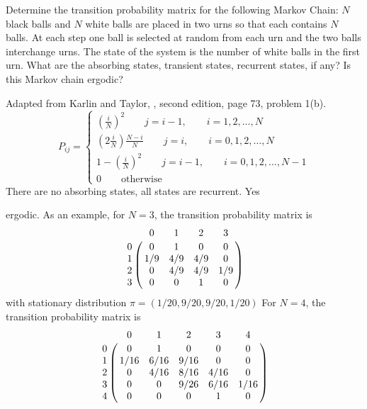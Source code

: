 \documentclass[12pt]{article}
\begin{document}
\begin{exercise}
    Determine the transition probability matrix for the following Markov
    Chain:  \( N \) black balls and \( N \) white balls are placed in
    two urns so that each contains \( N \) balls.  At each step one ball
    is selected at random from each urn and the two balls interchange
    urns.  The state of the system is the number of white balls in the
    first urn.  What are the absorbing states, transient states,
    recurrent states, if any?  Is this Markov chain ergodic?
\end{exercise}
\begin{solution}
    Adapted from Karlin and Taylor, , second edition, page 73, problem 1(b).
    \[
        P_{ij} =
        \begin{cases}
            (\frac{i}{N})^2 \qquad j = i-1, \qquad i=1,2,\dots,N \\
            (2\frac{i}{N})\frac{N-i}{N} \qquad j = i, \qquad i=0,1,2,\dots,N
            \\
            1- (\frac{i}{N})^2 \qquad j = i-1, \qquad i=0,1,2,\dots,N-1
            \\
            0 \qquad \text{otherwise}
        \end{cases}
    \] There are no absorbing states, all states are recurrent.  Yes

    ergodic.  As an example, for \( N = 3 \), the transition probability
    matrix is
    \[
        \bordermatrix{ & 0 & 1 & 2 & 3 \cr
        0 & 0 & 1 & 0 & 0 \cr
        1 & 1/9 & 4/9 & 4/9 & 0 \cr
        2 & 0 & 4/9 & 4/9 & 1/9 \cr
        3 & 0 & 0 & 1 & 0 }
    \] with stationary distribution \( \pi = (1/20, 9/20, 9/20, 1/20) \)
    For \( N = 4 \), the transition probability matrix is
    \[
        \bordermatrix{ & 0 & 1 & 2 & 3 & 4 \cr
        0 & 0 & 1 & 0 & 0 & 0 \cr
        1 & 1/16& 6/16& 9/16& 0 & 0 \cr
        2 & 0 & 4/16& 8/16& 4/16 & 0 \cr
        3 & 0 & 0 & 9/26& 6/16 & 1/16 \cr
        4 & 0 & 0 & 0 & 1 & 0 }
    \]
\end{solution}
\end{document}
